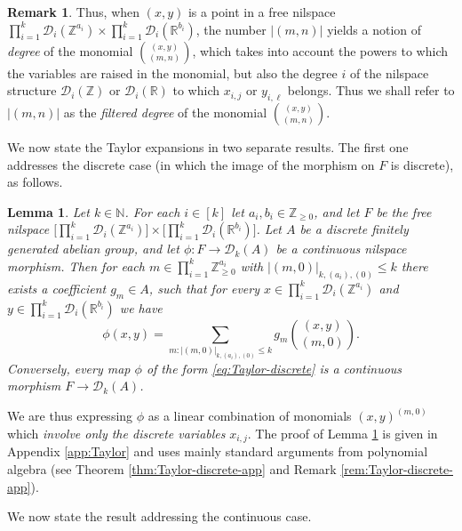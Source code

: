 \documentclass[a4paper,12pt,reqno]{amsart}
\newtheorem{lemma}[theorem]{Lemma}
\theoremstyle{definition}
\newtheorem{remark}[theorem]{Remark}
\def\to{\rightarrow}
\newcommand{\mc}{\mathcal}
\newcommand{\mb}{\mathbb}
\begin{document}
\begin{remark}\label{rem:monomial-degree}
Thus, when $(x,y)$ is a point in a free nilspace $\prod_{i=1}^k\mc{D}_i(\mb{Z}^{a_i})\times\prod_{i=1}^k\mc{D}_i(\mb{R}^{b_i})$, the number $|(m,n)|$ yields a notion of \emph{degree} of the monomial $\binom{(x,y)}{(m,n)}$, which takes into account the powers to which the variables are raised in the monomial, but also the degree $i$ of the nilspace structure $\mc{D}_i(\mb{Z})$ or $\mc{D}_i(\mb{R})$ to which $x_{i,j}$ or $y_{i,\ell}$ belongs. Thus we shall refer to $|(m,n)|$ as the \emph{filtered degree} of the monomial $\binom{(x,y)}{(m,n)}$.
\end{remark}
\noindent We now state the Taylor expansions in two separate results. The first one addresses the discrete case (in which the image of the morphism on $F$ is discrete), as follows.
\begin{lemma}\label{lem:Taylor-discrete}
Let $k\in \mb{N}$. For each $i\in [k]$ let $a_i,b_i\in\mb{Z}_{\ge 0}$, and let $F$ be the free nilspace $\big[\prod_{i=1}^k \mc{D}_i(\mb{Z}^{a_i})\big] \times \big[\prod_{i=1}^k \mc{D}_i( \mb{R}^{b_i})\big]$. Let $A$ be a discrete finitely generated abelian group, and let $\phi:F\to \mc{D}_k(A)$ be a continuous nilspace morphism. Then for each $m\in \prod_{i=1}^k \mb{Z}_{\ge 0}^{a_i}$ with $|(m,0)|_{k,(a_i),(0)}\le k$ there exists a coefficient $g_m\in A$, such that for every $x\in \prod_{i=1}^k \mc{D}_i(\mb{Z}^{a_i})$ and $y\in \prod_{i=1}^k \mc{D}_i( \mb{R}^{b_i})$ we have
\begin{equation}\label{eq:Taylor-discrete}
\phi(x,y)=\sum_{m:|(m,0)|_{k,(a_i),(0)}\le k} g_m \binom{(x,y)}{(m,0)}.
\end{equation}
Conversely, every map $\phi$ of the form \eqref{eq:Taylor-discrete} is a continuous morphism $F\to\mc{D}_k(A)$.
\end{lemma}
\noindent We are thus expressing $\phi$ as a linear combination of monomials $(x,y)^{(m,0)}$ which \emph{involve only the discrete variables} $x_{i,j}$. The proof of Lemma \ref{lem:Taylor-discrete} is given in Appendix \ref{app:Taylor} and uses mainly standard arguments from polynomial algebra (see Theorem \ref{thm:Taylor-discrete-app} and Remark \ref{rem:Taylor-discrete-app}).

 We now state the result addressing the continuous case.
\end{document}
